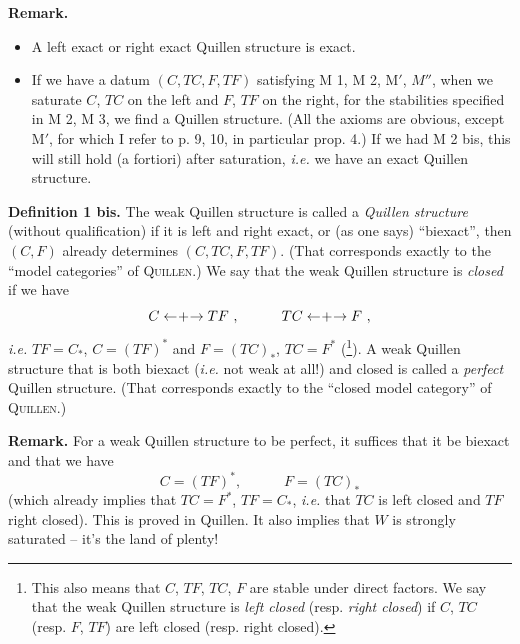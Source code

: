 \documentclass[11pt]{article}
\newcommand{\printedpage}[1]{\marginpar{\footnotesize p.~#1}}
\newcommand{\msp}[1]{\marginpar{\footnotesize [#1]}}
\newcommand{\clarrow}{\mathrel{\leftarrow\mkern-4mu{+}\mkern-4mu\rightarrow}}
\begin{document}
\msp{page 28}
\noindent\textbf{Remark.}
\begin{itemize}[leftmargin=3em]
\item[a)] A left exact or right exact Quillen structure is exact.
\item[b)] If we have a datum $(C, TC, F, TF)$ satisfying M 1, M 2, M$'$, $M''$, when we saturate $C$, $TC$ on the left and $F$, $TF$ on the right, for the stabilities specified in M 2, M 3, we find a Quillen structure. (All the axioms are obvious, except M$'$, for which I refer to p. 9, 10, in particular prop. 4.) If we had M 2 bis, this will still hold (a fortiori) after saturation, \textit{i.e.} we have an exact Quillen structure.
\end{itemize}

\noindent\textbf{Definition 1 bis.} The weak Quillen structure is called a \textit{Quillen structure} (without qualification) if it is left and right exact, or (as one says) ``biexact'', then $(C, F)$ already determines $(C, TC, F, TF)$. (That corresponds exactly to the ``model categories'' of \textsc{Quillen}.) We say that the weak Quillen structure is \textit{closed} if we have %
\[
C \clarrow TF\ , \qquad\quad TC \clarrow F\ ,
\]
\textit{i.e.} $TF = C_*$, $C = (TF)^*$ and $F = (TC)_*$, $TC = F^*$ (\footnote[21]{This also means that $C$, $TF$, $TC$, $F$ are stable under direct factors. We say that the weak Quillen structure is \textit{left closed} (resp. \textit{right closed}) if $C$, $TC$ (resp. $F$, $TF$) are left closed (resp. right closed).}). A weak Quillen structure that is both biexact (\textit{i.e.} not weak at all!) and closed is called a \textit{perfect} Quillen structure. (That corresponds exactly to the ``closed model category'' of \textsc{Quillen}.)

\msp{page 29}
\noindent\textbf{Remark.} For a weak Quillen structure to be perfect, it suffices that it be biexact and that we have
\[
C = (TF)^*, \qquad\quad F = (TC)_*
\]
(which already implies that $TC = F^*$, $TF = C_*$, \textit{i.e.} that $TC$ is left closed and $TF$ right closed). This is proved in Quillen. It also implies that $W$ is strongly saturated -- it's the land of plenty!

\clearpage
\printedpage{18}
\end{document}
